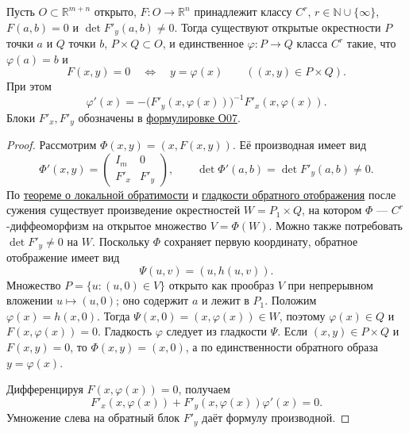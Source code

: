 \label{ticket:17}

\begin{theorem}
Пусть $O\subset\mathbb R^{m+n}$ открыто, $F:O\to\mathbb R^n$ принадлежит классу $C^r$, $r\in\mathbb N\cup\{\infty\}$, $F(a,b)=0$ и $\det F'_y(a,b)\ne0$.
Тогда существуют открытые окрестности $P$ точки $a$ и $Q$ точки $b$, $P\times Q\subset O$, и единственное $\varphi:P\to Q$ класса $C^r$ такие, что $\varphi(a)=b$ и
\[
  F(x,y)=0\quad\Longleftrightarrow\quad y=\varphi(x)
  \qquad((x,y)\in P\times Q).
\]
При этом
\[
  \varphi'(x)=-\bigl(F'_y(x,\varphi(x))\bigr)^{-1}F'_x(x,\varphi(x)).
\]
Блоки $F'_x,F'_y$ обозначены в \hyperref[definition:07]{формулировке О07}.
\end{theorem}

\begin{proof}
Рассмотрим $\Phi(x,y)=(x,F(x,y))$.
Её производная имеет вид
\[
  \Phi'(x,y)=\begin{pmatrix}I_m&0\\F'_x&F'_y\end{pmatrix},
  \qquad\det\Phi'(a,b)=\det F'_y(a,b)\ne0.
\]
По \hyperref[definition:05]{теореме о локальной обратимости} и \hyperref[ticket:16]{гладкости обратного отображения} после сужения существует произведение окрестностей $W=P_1\times Q$, на котором $\Phi$ --- $C^r$-диффеоморфизм на открытое множество $V=\Phi(W)$.
Можно также потребовать $\det F'_y\ne0$ на $W$.
Поскольку $\Phi$ сохраняет первую координату, обратное отображение имеет вид
\[
  \Psi(u,v)=(u,h(u,v)).
\]
Множество $P=\{u:(u,0)\in V\}$ открыто как прообраз $V$ при непрерывном вложении $u\mapsto(u,0)$; оно содержит $a$ и лежит в $P_1$.
Положим $\varphi(x)=h(x,0)$.
Тогда $\Psi(x,0)=(x,\varphi(x))\in W$, поэтому $\varphi(x)\in Q$ и $F(x,\varphi(x))=0$.
Гладкость $\varphi$ следует из гладкости $\Psi$.
Если $(x,y)\in P\times Q$ и $F(x,y)=0$, то $\Phi(x,y)=(x,0)$, а по единственности обратного образа $y=\varphi(x)$.

Дифференцируя $F(x,\varphi(x))=0$, получаем
\[
  F'_x(x,\varphi(x))+F'_y(x,\varphi(x))\varphi'(x)=0.
\]
Умножение слева на обратный блок $F'_y$ даёт формулу производной.
\end{proof}
